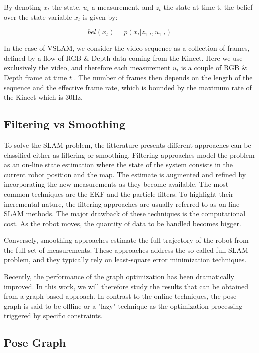 By denoting $x_t$ the state, $u_t$ a measurement, and $z_t$ the state at time t, the belief over the state variable $x_t$ is given by:

\[bel(x_t) = p(x_t | z_{1:t}, u_{1:t})\]

In the case of \gls{VSLAM}, we consider the video sequence as a collection of frames, defined by a flow of RGB \& Depth data coming from the Kinect. Here we use exclusively the video, and therefore each measurement $u_t$ is a couple of RGB \& Depth frame at time $t$ . The number of frames then depends on the length of the sequence and the effective frame rate, which is bounded by the maximum rate of the Kinect which is 30Hz.


\subsection{Filtering vs Smoothing}

To solve the \gls{SLAM} problem, the litterature presents different approaches can be classified either as filtering or smoothing. Filtering approaches model the problem as an on-line state estimation where the state of the system consists in the current robot position and the map. The estimate is augmented and refined by incorporating the new measurements as they become available.
The most common techniques are the \gls{EKF} and the particle filters. To highlight their incremental nature, the filtering approaches are usually referred to as on-line \gls{SLAM} methods.
The major drawback of these techniques is the computational cost. As the robot moves, the quantity of data to be handled becomes bigger.

Conversely, smoothing approaches estimate the full trajectory of the robot from the full set of measurements. These approaches address the so-called full \gls{SLAM} problem, and they typically rely on least-square error minimization techniques.

Recently, the performance of the graph optimization has been dramatically improved. In this work, we will therefore study the results that can be obtained from a graph-based approach. In contrast to the online techniques, the pose graph is said to be offline or a "lazy" technique as the optimization processing triggered by specific constraints.

\subsection{Pose Graph}

